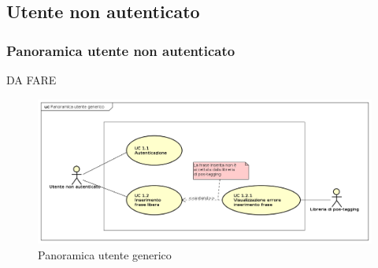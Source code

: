 \subsection{Utente non autenticato}
\subsubsection{Panoramica utente non autenticato}
DA FARE
\begin{figure}[H]
\centering
\includegraphics[width=17cm]{img/PanoramicaUtenteGenerico.png} 
\caption{Panoramica utente generico}\label{fig:1}
\end{figure}


